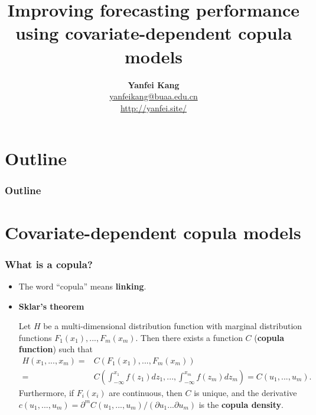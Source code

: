 \documentclass[10pt,aspectratio=169]{beamer}
\title[Covariate-Dependent Copula Modeling]{\textbf{Improving forecasting performance
    using covariate-dependent copula models}}
\author[Yanfei Kang]{%
  \vspace{0.5cm}\textbf{Yanfei Kang}
  \\\vspace{0.3cm}\url{yanfeikang@buaa.edu.cn}\\\url{http://yanfei.site/}}
\institute[SEM.BUAA.EDU.CN]{\footnotesize{\textbf{School of Economics and Management
      \\Beihang University}}}
\date{}
\begin{document}
\begin{frame}[plain]
  \addtocounter{framenumber}{-1}
  \titlepage
\end{frame}

\section*{Outline}
\begin{frame}
  \frametitle{Outline}
  \addtocounter{framenumber}{-1}
  \tableofcontents
\end{frame}








\section{Covariate-dependent copula models}


\begin{frame}
  \frametitle{What is a copula?}
  \begin{itemize}
  \item The word ``copula'' means \textbf{linking}.
  \item \textbf{Sklar's theorem}

    Let $H$ be a multi-dimensional distribution function with marginal
    distribution functions $F_1(x_1),...,F_m(x_m)$. Then there exists a
    function $C$ (\textbf{copula function}) such that
    \begin{equation*}
      \begin{split}
        H(x_1,...,x_m)= & C(F_1(x_1),...,F_m(x_m))\\
        =&C\left(\int_{-\infty}^{x_1}f(z_1)dz_1,...,\int_{-\infty}^{x_m}f(z_m)dz_m\right)=C(u_1,...,u_m).
      \end{split}
    \end{equation*}
    Furthermore, if $F_i(x_i)$ are continuous, then $C$ is unique, and the derivative $c(u_1,...,u_m)= \partial^m C(u_1,...,u_m)/(\partial u_1...
    \partial u_m)$ is the \textbf{copula density}.

  \end{itemize}
\end{frame}
\end{document}
